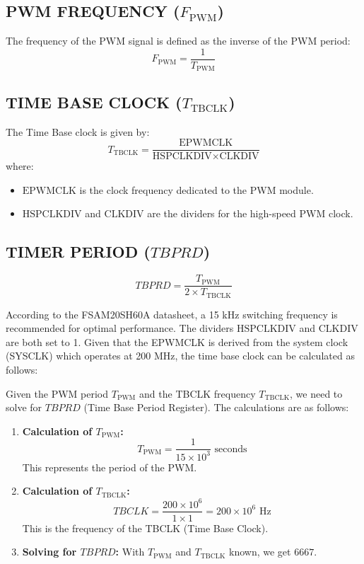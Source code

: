 \subsection{PWM FREQUENCY (\( F_{\text{PWM}} \))}

The frequency of the PWM signal is defined as the inverse of the PWM period:
\begin{equation}
	F_{\text{PWM}} = \frac{1}{T_{\text{PWM}}}
\end{equation}

\subsection{TIME BASE CLOCK (\( T_{\text{TBCLK}} \))}

The Time Base clock is given by:
\begin{equation}
	T_{\text{TBCLK}} = \frac{\text{EPWMCLK}}{\text{HSPCLKDIV} \times \text{CLKDIV}}
\end{equation}
where:
\begin{itemize}
	\item \( \text{EPWMCLK} \) is the clock frequency dedicated to the PWM module.
	\item \( \text{HSPCLKDIV} \) and \( \text{CLKDIV} \) are the dividers for the high-speed PWM clock.
\end{itemize}

\subsection{TIMER PERIOD (\( TBPRD \))}

\begin{equation}
	TBPRD = \frac{T_{\text{PWM}}}{2 \times T_{\text{TBCLK}}}
\end{equation}

According to the FSAM20SH60A datasheet, a 15 kHz switching frequency is recommended for optimal performance. The dividers \( \text{HSPCLKDIV} \) and \( \text{CLKDIV} \) are both set to 1. Given that the EPWMCLK is derived from the system clock (SYSCLK) which operates at 200 MHz, the time base clock can be calculated as follows:

Given the PWM period \( T_{\text{PWM}} \) and the TBCLK frequency \( T_{\text{TBCLK}} \), we need to solve for \( TBPRD \) (Time Base Period Register). The calculations are as follows:

\begin{enumerate}
	\item \textbf{Calculation of \( T_{\text{PWM}} \):}
	\[
		T_{\text{PWM}} = \frac{1}{15 \times 10^3} \text{ seconds}
	\]
	This represents the period of the PWM.

	\item \textbf{Calculation of \( T_{\text{TBCLK}} \):}
	\[
		TBCLK = \frac{200 \times 10^6}{1 \times 1} = 200 \times 10^6 \text{ Hz}
	\]
	This is the frequency of the TBCLK (Time Base Clock).

	\item \textbf{Solving for \( TBPRD \):}
	With \( T_{\text{PWM}} \) and \( T_{\text{TBCLK}} \) known, we get $6667$.
\end{enumerate}

